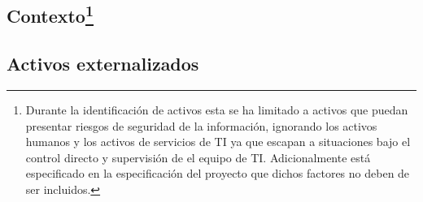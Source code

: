 \subsection{Contexto\footnote{
    Durante la identificación de activos esta se ha limitado a activos que puedan presentar riesgos de seguridad de la información, ignorando los activos humanos y los activos de servicios de TI ya que escapan a situaciones bajo el control directo y supervisión de el equipo de TI. Adicionalmente está especificado en la especificación del proyecto que dichos factores no deben de ser incluidos.}}
    





\subsection{Activos externalizados}



